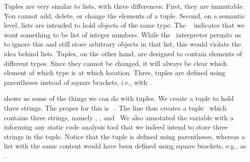 %
\label{sec:tuples}%
%
%
%
%
%
%
%
%
%
%
%
%
%
%
Tuples are very similar to lists, with three differences:
First, they are immutable.
You cannot add, delete, or change the elements of a tuple.
Second, on a semantic level, lists are intended to hold objects of the same type.
The ~ indicates that we want something to be list of integer numbers.
While the \python\ interpreter permits us to ignore this and still store arbitrary objects in that list, this would violate the idea behind lists.
Tuples, on the other hand, are designed to contain elements of different types.
Since they cannot be changed, it will always be clear which element of which type is at which location.
Three, tuples are defined using parentheses instead of square brackets, i.e., with~\pythonIdx{(\idxdots)}.%
%
%
%
\begin{sloppypar}%
 shows us some of the things we can do with tuples.
We create a tuple  to hold three strings.
The proper  for this is ~\cite{PEP585}.
The line  thus creates a tuple~ which contains three strings, namely , , and~
We also annotated the variable with a  informing any static code analysis tool that we indeed intend to store three strings in the tuple.
Notice that the tuple is defined using parentheses, whereas a list with the same content would have been defined using square brackets, e.g., as .%
\end{sloppypar}%
